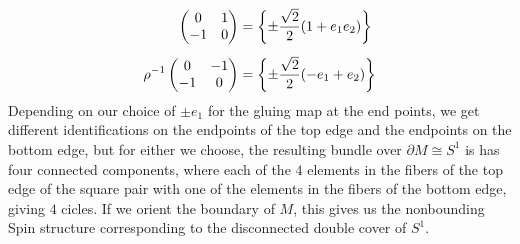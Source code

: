 \begin{exmp}
\begin{align*}
\begin{pmatrix}
0 & 1 \\
-1 & 0
\end{pmatrix} &= \left\lbrace \pm\frac{\sqrt{2}}{2}(1 + e_1e_2) \right\rbrace \\[5pt]
\rho^{-1}\begin{pmatrix}
0 & -1 \\
-1 & 0
\end{pmatrix} &= \left\lbrace \pm\frac{\sqrt{2}}{2}(-e_1 + e_2) \right\rbrace
\end{align*}
%
Depending on our choice of $\pm e_1$ for the gluing map at the end points, we
get different identifications on the endpoints of the top edge and the
endpoints on the bottom edge, but for either we choose, the resulting bundle
over $\partial M \cong S^1$ is has four connected components, where each of the
$4$ elements in the fibers of the top edge of the square pair with one of the
elements in the fibers of the bottom edge, giving $4$ cicles. If we orient
the boundary of $M$, this gives us the nonbounding Spin structure corresponding
to the disconnected double cover of $S^1$. \\


\end{exmp}
